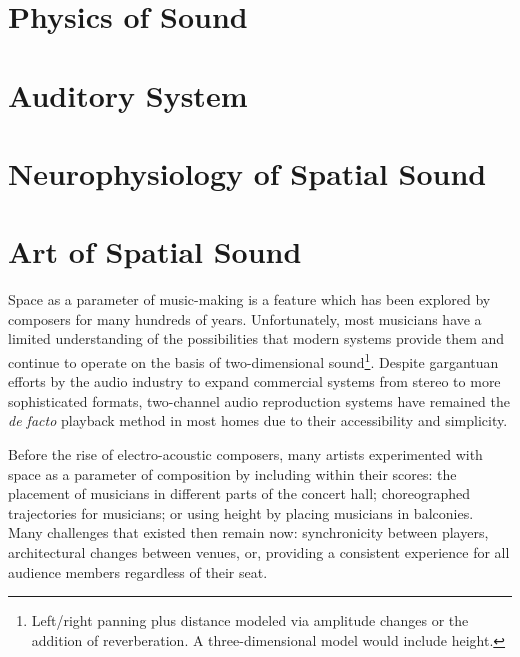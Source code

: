
\section{Physics of Sound}


\section{Auditory System}


\section{Neurophysiology of Spatial Sound}

\section{Art of Spatial Sound}

Space as a parameter of music-making is a feature which has been explored by composers for many hundreds of years. Unfortunately, most musicians have a limited understanding of the possibilities that modern systems provide them and continue to operate on the basis of two-dimensional sound\footnote{Left/right panning plus distance modeled via amplitude changes or the addition of reverberation. A three-dimensional model would include height.}. Despite gargantuan efforts by the audio industry to expand commercial systems from stereo to more sophisticated formats, two-channel audio reproduction systems have remained the \textit{de facto} playback method in most homes due to their accessibility and simplicity. 

Before the rise of electro-acoustic composers, many artists experimented with space as a parameter of composition by including within their scores: the placement of musicians in different parts of the concert hall; choreographed trajectories for musicians; or using height by placing musicians in balconies. Many challenges that existed then remain now: synchronicity between players, architectural changes between venues, or, providing a consistent experience for all audience members regardless of their seat. 

